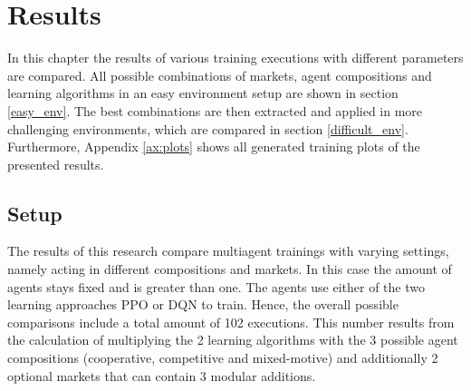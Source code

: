 %
%
\chapter{Results}\label{sec:Results}
In this chapter the results of various training executions with different parameters are compared. All possible combinations of markets, agent compositions and learning algorithms in an easy environment setup are shown in section \ref{easy_env}. The best combinations are then extracted and applied in more challenging environments, which are compared in section \ref{difficult_env}. Furthermore, Appendix \ref{ax:plots} shows all generated training plots of the presented results.

\section{Setup} \label{setup}

The results of this research compare multiagent trainings with varying settings, namely acting in different compositions and markets. In this case the amount of agents stays fixed and is greater than one. The agents use either of the two learning approaches PPO or DQN to train. Hence, the overall possible comparisons include a total amount of 102 executions. This number results from the calculation of multiplying the 2 learning algorithms with the 3 possible agent compositions (cooperative, competitive and mixed-motive) and additionally 2 optional markets that can contain 3 modular additions. 

